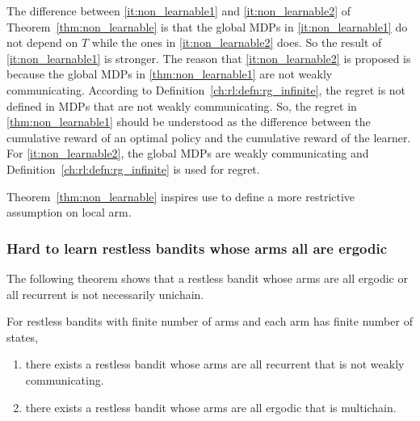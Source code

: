 The difference between \ref{it:non_learnable1} and \ref{it:non_learnable2} of Theorem~\ref{thm:non_learnable} is that the global MDPs in \ref{it:non_learnable1} do not depend on $T$ while the ones in \ref{it:non_learnable2} does.
So the result of \ref{it:non_learnable1} is stronger.
The reason that \ref{it:non_learnable2} is proposed is because the global MDPs in \ref{thm:non_learnable1} are not weakly communicating.
According to Definition~\ref{ch:rl:defn:rg_infinite}, the regret is not defined in MDPs that are not weakly communicating.
So, the regret in \ref{thm:non_learnable1} should be understood as the difference between the cumulative reward of an optimal policy and the cumulative reward of the learner. 
For \ref{it:non_learnable2}, the global MDPs are weakly communicating and Definition~\ref{ch:rl:defn:rg_infinite} is used for regret.

Theorem~\ref{thm:non_learnable} inspires use to define a more restrictive assumption on local arm.

\subsubsection{Hard to learn restless bandits whose arms all are ergodic}

The following theorem shows that a restless bandit whose arms are all ergodic or all recurrent is not necessarily unichain.

\begin{thm}
    \label{thm:multichain}
    For restless bandits with finite number of arms and each arm has finite number of states,
    \begin{enumerate}[label=(\roman*)]
        \item \label{thm:not_ergodic} there exists a restless bandit whose arms are all recurrent that is not weakly communicating. %
        \item \label{thm:ergodic_arms_multichain_RB} there exists a restless bandit whose arms are all ergodic that is multichain.
    \end{enumerate}
\end{thm}

